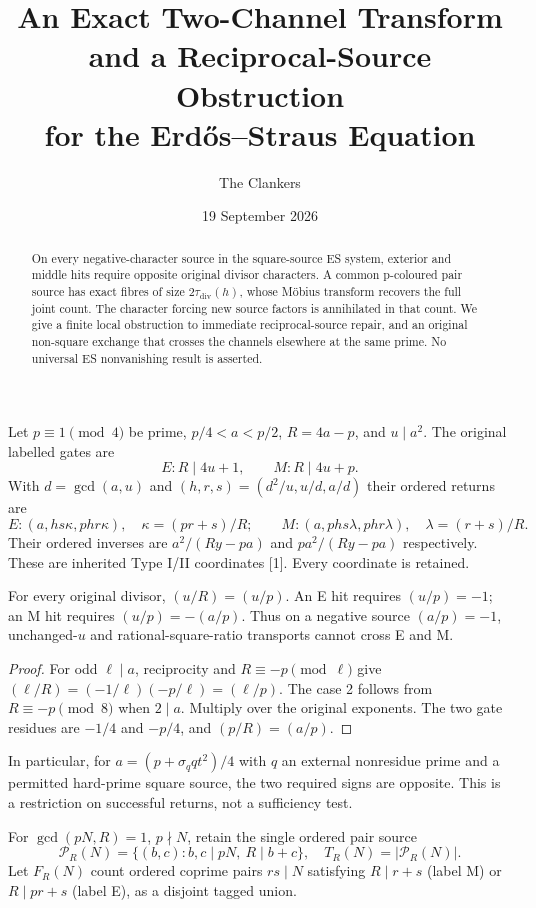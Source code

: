 \documentclass[11pt,reqno]{amsart}
\title[Exact two-channel and reciprocal-source comparison]{An Exact Two-Channel Transform and a Reciprocal-Source Obstruction\\for the Erd\H{o}s--Straus Equation}
\author{The Clankers}\date{19 September 2026}
\begin{document}
\begin{abstract}
On every negative-character source in the square-source ES system, exterior and
middle hits require opposite original divisor characters. A common p-coloured
pair source has exact fibres of size $2\tau_{\mathrm{div}}(h)$, whose M\"obius transform recovers
the full joint count. The character forcing new source factors is annihilated in
that count. We give a finite local obstruction to immediate reciprocal-source
repair, and an original non-square exchange that crosses the channels elsewhere
at the same prime. No universal ES nonvanishing result is asserted.
\end{abstract}\maketitle

Let $p\equiv1\pmod4$ be prime, $p/4<a<p/2$, $R=4a-p$, and $u\mid a^2$.
The original labelled gates are
\[
 E:R\mid4u+1,\qquad M:R\mid4u+p.
\]
With $d=\gcd(a,u)$ and $(h,r,s)=(d^2/u,u/d,a/d)$ their ordered returns are
\[
 E:(a,hs\kappa,phr\kappa),\quad\kappa=(pr+s)/R;
\qquad M:(a,phs\lambda,phr\lambda),\quad\lambda=(r+s)/R.  \tag{1}
\]
Their ordered inverses are $a^2/(Ry-pa)$ and $pa^2/(Ry-pa)$ respectively.
These are inherited Type I/II coordinates [1]. Every coordinate is retained.

\begin{proposition}
For every original divisor, $(u/R)=(u/p)$. An E hit requires $(u/p)=-1$;
an M hit requires $(u/p)=-(a/p)$. Thus on a negative source $(a/p)=-1$,
unchanged-$u$ and rational-square-ratio transports cannot cross E and M.
\end{proposition}
\begin{proof}
For odd $\ell\mid a$, reciprocity and $R\equiv-p\pmod\ell$ give
$(\ell/R)=(-1/\ell)(-p/\ell)=(\ell/p)$. The case 2 follows from
$R\equiv-p\pmod8$ when $2\mid a$. Multiply over the original exponents.
The two gate residues are $-1/4$ and $-p/4$, and $(p/R)=(a/p)$.
\end{proof}
In particular, for $a=(p+\sigma_q qt^2)/4$ with $q$ an external nonresidue
prime and a permitted hard-prime square source, the two required signs are
opposite. This is a restriction on successful returns, not a sufficiency test.

For $\gcd(pN,R)=1$, $p\nmid N$, retain the single ordered pair source
\[
 \mathcal P_R(N)=\{(b,c):b,c\mid pN,\ R\mid b+c\},\quad T_R(N)=|\mathcal P_R(N)|.
\]
Let $F_R(N)$ count ordered coprime pairs $rs\mid N$ satisfying $R\mid r+s$
(label M) or $R\mid pr+s$ (label E), as a disjoint tagged union.
\end{document}
